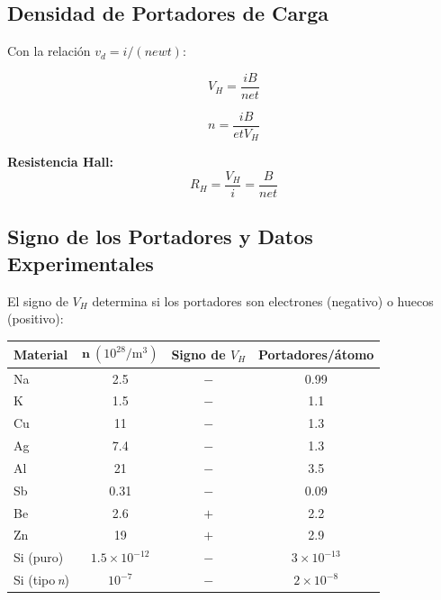 \documentclass[12pt, letterpaper]{report}
\numberwithin{equation}{section}
\begin{document}
\subsection{Densidad de Portadores de Carga}

Con la relación $v_d=i/(newt)$:

\begin{equation}
  \boxed{V_H = \frac{iB}{net}}
  \label{eq:VHall}
\end{equation}

\begin{equation}
  \boxed{n = \frac{iB}{etV_H}}
  \label{eq:nHall}
\end{equation}

\textbf{Resistencia Hall:}
\begin{equation}
  R_H = \frac{V_H}{i} = \frac{B}{net}
  \label{eq:RHall}
\end{equation}

\subsection{Signo de los Portadores y Datos Experimentales}

El signo de $V_H$ determina si los portadores son electrones (negativo) o
huecos (positivo):

\vspace{6pt}
\begin{center}
\begin{tabular}{lccc}
  \toprule
  \textbf{Material} &
  $\boldsymbol{n}\ (10^{28}/\mathrm{m}^3)$ &
  \textbf{Signo de }$V_H$ &
  \textbf{Portadores/átomo} \\
  \midrule
  Na              & 2.5                & $-$ & 0.99              \\
  K               & 1.5                & $-$ & 1.1               \\
  Cu              & 11                 & $-$ & 1.3               \\
  Ag              & 7.4                & $-$ & 1.3               \\
  Al              & 21                 & $-$ & 3.5               \\
  Sb              & 0.31               & $-$ & 0.09              \\
  Be              & 2.6                & $+$ & 2.2               \\
  Zn              & 19                 & $+$ & 2.9               \\
  Si (puro)       & $1.5\times10^{-12}$& $-$ & $3\times10^{-13}$ \\
  Si (tipo\,\textit{n}) & $10^{-7}$   & $-$ & $2\times10^{-8}$  \\
  \bottomrule
\end{tabular}
\end{center}
\end{document}
